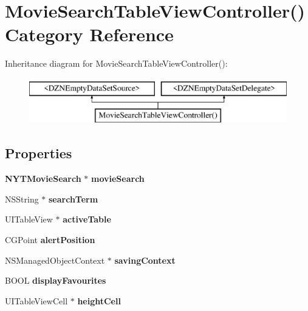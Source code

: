 \section{Movie\+Search\+Table\+View\+Controller() Category Reference}
\label{category_movie_search_table_view_controller_07_08}
Inheritance diagram for Movie\+Search\+Table\+View\+Controller()\+:\begin{figure}[H]
\begin{center}
\leavevmode
\includegraphics[height=2.000000cm]{category_movie_search_table_view_controller_07_08}
\end{center}
\end{figure}
\subsection*{Properties}
\begin{DoxyCompactItemize}
\item 
{\bf N\+Y\+T\+Movie\+Search} $\ast$ {\bfseries movie\+Search}\label{category_movie_search_table_view_controller_07_08_aa79d55ce89fb9a7d361c378a7c75a0ce}

\item 
N\+S\+String $\ast$ {\bfseries search\+Term}\label{category_movie_search_table_view_controller_07_08_a794f4c7c02ac14cbbd051b00eb901783}

\item 
U\+I\+Table\+View $\ast$ {\bfseries active\+Table}\label{category_movie_search_table_view_controller_07_08_aec3b3abd5de0560b56cc714f22728bcf}

\item 
C\+G\+Point {\bfseries alert\+Position}\label{category_movie_search_table_view_controller_07_08_a19cbfe9fbd6ada9fe514b76cd0b543a7}

\item 
N\+S\+Managed\+Object\+Context $\ast$ {\bfseries saving\+Context}\label{category_movie_search_table_view_controller_07_08_ad935b193f919a459deda475e35798272}

\item 
B\+O\+O\+L {\bfseries display\+Favourites}\label{category_movie_search_table_view_controller_07_08_aa2e39a1e326c2e5e51c9201903cc7e5b}

\item 
U\+I\+Table\+View\+Cell $\ast$ {\bf height\+Cell}
\end{DoxyCompactItemize}



